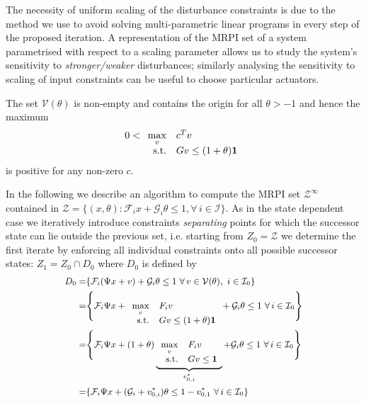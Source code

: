 The necessity of uniform scaling of the disturbance constraints is due to the method we use to avoid
solving multi-parametric linear programs in every step of the proposed iteration.
A representation of the MRPI set of a system parametrised with respect to a scaling parameter allows us
to study the system's sensitivity to \emph{stronger/weaker} disturbances; similarly analysing the sensitivity to scaling of input 
constraints can be useful to choose particular actuators.
%
\begin{rem}
The set $\mathcal V(\theta)$ is non-empty and contains the origin for all $\theta>-1$ and hence the 
maximum
%
\[
0<\begin{array}[t]{rl}
\displaystyle\max_v & c^T v\\
\text{s.t.}& Gv \leq (1+\theta){\bf{1}}
\end{array}
\]
%
is positive for any non-zero $c$.
\end{rem}
%
In the following we describe an algorithm to compute the MRPI set $\mathcal Z^\infty$ contained in 
$\mathcal Z = \{(x,\theta):\mathcal F_i x+\mathcal G_i\theta \leq 1,\forall\, i\in\mathcal I\}$.
As in the state dependent case we iteratively introduce constraints \emph{separating} points
for which the successor state can lie outside the previous set, i.e. starting from $Z_0 = \mathcal Z$
we determine the first iterate by enforcing all individual constraints onto all possible successor states:
$Z_1=Z_0\cap D_0$ where $D_0$ is defined by
%
\begin{equation}\small
\begin{split}
	D_0 =& \{\mathcal F_i(\Psi x+v) + \mathcal G_i\theta \leq 1 \ \forall\, v\in\mathcal V(\theta), \ i\in\mathcal I_0\}\\
	=&\Biggl\{\mathcal F_i\Psi x + \begin{array}[t]{rl}\displaystyle\max_v& F_i v \\ \text{s.t.}& Gv \leq 
	(1+\theta){\bf{1}} \end{array}
	 + \mathcal G_i \theta \leq 1 \ \forall\, i\in\mathcal I_0\Biggr\}\\
	=&\Biggl\{\mathcal F_i\Psi x + (1+\theta)\underbrace{\begin{array}[t]{rl}\displaystyle\max_v& F_i v \\ 
	\text{s.t.}& Gv \leq {\bf{1}}\end{array}}_{v_{0,i}^\ast}
	 + \mathcal G_i \theta \leq 1 \ \forall\, i\in\mathcal I_0\Biggr\}\\
	=&\{\mathcal F_i\Psi x + (\mathcal G_i + v_{0,i}^\ast)\theta \leq 1 - v_{0,1}^\ast \ \forall \, i\in\mathcal I_0
	\}
\end{split}\end{equation}
